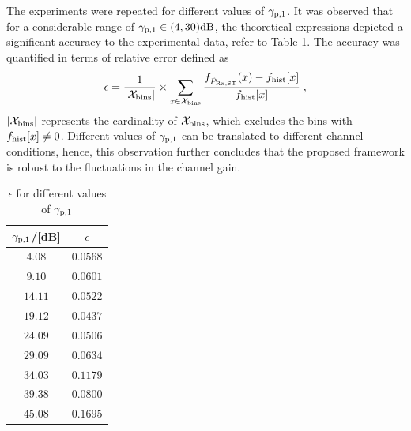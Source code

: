 The experiments were repeated for different values of ${\gamma}_{\text{p,1}}$. It was observed that for a considerable range of ${\gamma}_{\text{p,1}} \in (4,30)\SI{}{dB}$, the theoretical expressions depicted a significant accuracy to the experimental data, refer to Table \ref{nichtzentral}. The accuracy was quantified in terms of relative error defined as
\begin{equation}
\label{fr}
\epsilon = \frac{1}{|\mathcal X_{\text{bins}}|} \times \sum_{x \in \mathcal X_{\text{bins}}} \frac{f_{\hat{P}_{\text{Rx,ST}}}(x) - f_{\text{hist}}[x]}{f_{\text{hist}}[x]} \;  , 
\end{equation}
$|\mathcal X_{\text{bins}}|$ represents the cardinality of $\mathcal X_{\text{bins}}$, which excludes the bins with $f_{\text{hist}}[x] \neq 0$. Different values of ${\gamma}_{\text{p,1}}$ can be translated to different channel conditions, hence, this observation further concludes that the proposed framework is robust to the fluctuations in the channel gain. 


\begin{table}
        \renewcommand{\arraystretch}{1.4}
	\centering
	\caption{$\epsilon$ for different values of ${\gamma}_{\text{p,1}}$}
	\label{nichtzentral}
	\begin{tabular}{c||c} 
		\bfseries ${\gamma}_{\text{p,1}}$/[dB] &  \bfseries $\epsilon$ \\ \hline \hline
		$4.08$ &  $0.0568$ \\
		$9.10$ &  $0.0601$ \\
		$14.11$ & $0.0522$ \\
		$19.12$ & $0.0437$ \\
		$24.09$ & $0.0506$ \\
		$29.09$ & $0.0634$ \\
		$34.03$ & $0.1179$ \\
		$39.38$ & $0.0800$ \\
		$45.08$ & $0.1695$ \\ \hline
	\end{tabular}
\end{table}


